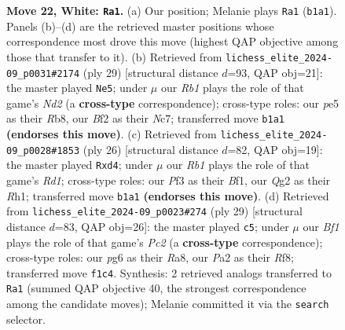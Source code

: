 \documentclass[11pt]{article}
\begin{document}
\begin{figure}[p]
\caption{\textbf{Move 22, White: \texttt{Ra1}.} (a) Our position; Melanie plays \texttt{Ra1} (\texttt{b1a1}). Panels (b)--(d) are the retrieved master positions whose correspondence most drove this move (highest QAP objective among those that transfer to it). (b) Retrieved from \texttt{lichess\_elite\_2024-09\_p0031\#2174} (ply 29) [structural distance $d$=93, QAP obj=21]: the master played \texttt{Ne5}; under $\mu$ our \emph{Rb1} plays the role of that game's \emph{Nd2} (a \textbf{cross-type} correspondence); cross-type roles: our \emph{p}e5 as their \emph{R}b8, our \emph{B}f2 as their \emph{N}c7; transferred move \texttt{b1a1} \textbf{(endorses this move)}. (c) Retrieved from \texttt{lichess\_elite\_2024-09\_p0028\#1853} (ply 26) [structural distance $d$=82, QAP obj=19]: the master played \texttt{Rxd4}; under $\mu$ our \emph{Rb1} plays the role of that game's \emph{Rd1}; cross-type roles: our \emph{P}f3 as their \emph{B}f1, our \emph{Q}g2 as their \emph{R}h1; transferred move \texttt{b1a1} \textbf{(endorses this move)}. (d) Retrieved from \texttt{lichess\_elite\_2024-09\_p0023\#274} (ply 29) [structural distance $d$=83, QAP obj=26]: the master played \texttt{c5}; under $\mu$ our \emph{Bf1} plays the role of that game's \emph{Pc2} (a \textbf{cross-type} correspondence); cross-type roles: our \emph{p}g6 as their \emph{R}a8, our \emph{P}a2 as their \emph{R}f8; transferred move \texttt{f1c4}. Synthesis: 2 retrieved analogs transferred to \texttt{Ra1} (summed QAP objective 40, the strongest correspondence among the candidate moves); Melanie committed it via the \texttt{search} selector.}
\label{fig:thought-m42}
\end{figure}

\clearpage
\end{document}
